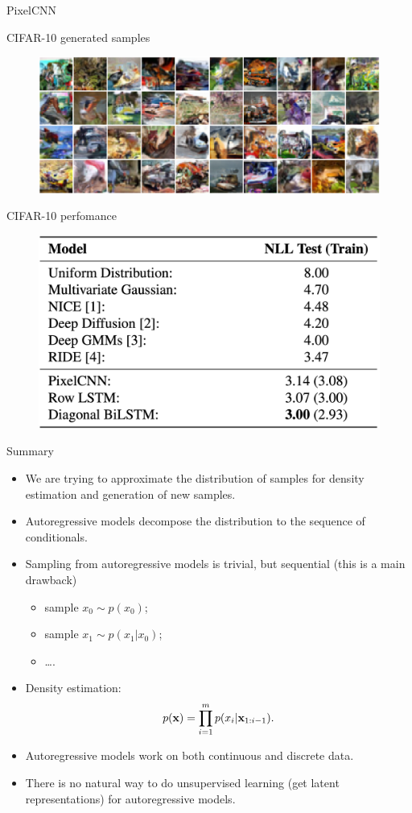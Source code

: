 \begin{frame}{PixelCNN}
	\begin{block}{CIFAR-10 generated samples}
		\begin{figure}
			\centering
	  		\includegraphics[width=0.7\linewidth]{figs/pixelcnn_results}
		\end{figure}
	\end{block}
	\vspace{-0.2cm}
	\begin{block}{CIFAR-10 perfomance}
		\begin{figure}
			\centering
	  		\includegraphics[width=0.45\linewidth]{figs/pixelcnn_results2}
		\end{figure}
	\end{block}
\end{frame}
\begin{frame}{Summary}
    \begin{itemize}
    	\item We are trying to approximate the distribution of samples for density estimation and generation of new samples.
    	\item Autoregressive models decompose the distribution to the sequence of conditionals.
        \item Sampling from autoregressive models is trivial, but sequential (this is a main drawback)
        \begin{itemize}
            \item sample $x_0 \sim p(x_0)$;
            \item sample $x_1 \sim p(x_1 | x_0)$;
            \item \dots.
        \end{itemize}
        \item Density estimation:
        \vspace{-0.2cm}
        \[
            p(\mathbf{x}) = \prod_{i=1}^m p(x_i | \mathbf{x}_{1:i - 1}).
        \]
        \vspace{-0.2cm}
        \item Autoregressive models work on both continuous and discrete data.
        \item There is no natural way to do unsupervised learning (get latent representations) for autoregressive models.
    \end{itemize}
\end{frame}

 